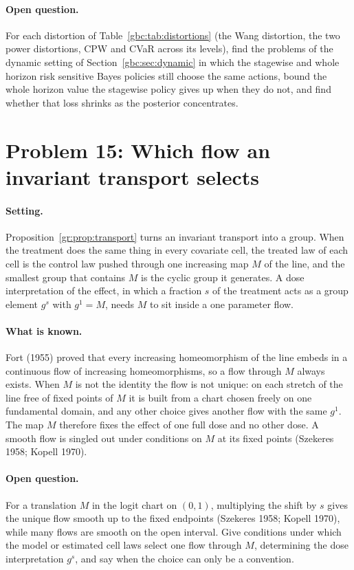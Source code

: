 \paragraph{Open question.} For each distortion of Table~\ref{gbc:tab:distortions} (the Wang distortion, the two power distortions, CPW and CVaR across its levels), find the problems of the dynamic setting of Section~\ref{gbc:sec:dynamic} in which the stagewise and whole horizon risk sensitive Bayes policies still choose the same actions, bound the whole horizon value the stagewise policy gives up when they do not, and find whether that loss shrinks as the posterior concentrates.

\section{Problem 15: Which flow an invariant transport selects}

\paragraph{Setting.} Proposition~\ref{gr:prop:transport} turns an invariant transport into a group. When the treatment does the same thing in every covariate cell, the treated law of each cell is the control law pushed through one increasing map $M$ of the line, and the smallest group that contains $M$ is the cyclic group it generates. A dose interpretation of the effect, in which a fraction $s$ of the treatment acts as a group element $g^{s}$ with $g^{1}=M$, needs $M$ to sit inside a one parameter flow.

\paragraph{What is known.} Fort (1955) proved that every increasing homeomorphism of the line embeds in a continuous flow of increasing homeomorphisms, so a flow through $M$ always exists. When $M$ is not the identity the flow is not unique: on each stretch of the line free of fixed points of $M$ it is built from a chart chosen freely on one fundamental domain, and any other choice gives another flow with the same $g^{1}$. The map $M$ therefore fixes the effect of one full dose and no other dose. A smooth flow is singled out under conditions on $M$ at its fixed points (Szekeres 1958; Kopell 1970).

\paragraph{Open question.} For a translation $M$ in the logit chart on $(0,1)$, multiplying the shift by $s$ gives the unique flow smooth up to the fixed endpoints (Szekeres 1958; Kopell 1970), while many flows are smooth on the open interval. Give conditions under which the model or estimated cell laws select one flow through $M$, determining the dose interpretation $g^s$, and say when the choice can only be a convention.

